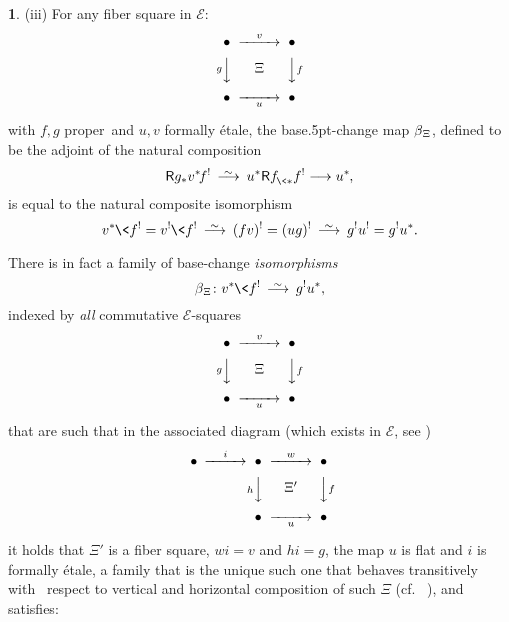 \documentclass{compositio}
\theoremstyle{plain}
\theoremstyle{definition}
\newtheorem{cosa}[thm]{}
\theoremstyle{remark}
\numberwithin{equation}{thm}
\begin{document}
\begin{cosa}
{\rm(iii)} For any fiber square in\/ ${\mathscr{E}}\!:${\vspace{2pt}}
$$
\CD
\bullet @>v>> \bullet  \\
@V g VV @VV f V \\
\bullet@>{\vbox to 0pt{\vss\hbox{$\Xi$}\vskip.21in}} > {\vbox to 0pt{\vskip-1.2 ex\hbox{$\scriptstyle u$}\vss}} >\bullet
\endCD
$$
with $f,g$ proper\ and $ u,v$ formally \'etale, the base{\kern.5pt}-change map $\beta_{{\mkern1mu}\Xi}$,  defined to be the
adjoint of the natural composition
\begin{equation}
\label{bcadj}
{\mathsf R} g_*v^*\!f^!{{\mkern8mu\longrightarrow \mkern-25.5mu{}^\sim\mkern17mu}} u^*{{\mathsf R} f^{}_{{\mkern-1mu}\<*}} f^! \longrightarrow u^*{\mkern-1mu},
\end{equation}
is equal to the natural composite isomorphism
\begin{equation}\label{beta}
v^*{\mkern-1mu}\<f^!= v^!{\mkern-1mu}\<f^!
{{\mkern8mu\longrightarrow \mkern-25.5mu{}^\sim\mkern17mu}} (fv)^!=(ug)^!{{\mkern8mu\longrightarrow \mkern-25.5mu{}^\sim\mkern17mu}}
g^!u^!  =g^!u^*.
\end{equation}

\goodbreak

There is in fact a family of base-change \emph{isomorphisms} 
\begin{equation}\label{bch}
\beta_{{\mkern1mu}\Xi}\colon v^*{\mkern-1mu}\<f^!{{\mkern8mu\longrightarrow \mkern-25.5mu{}^\sim\mkern17mu}} g^!u^*,
\end{equation}
indexed by \emph{all} commutative ${\mathscr{E}}$-squares 
$$
\CD
\bullet @>v>> \bullet  \\
@V g VV @VV f V \\
\bullet@>{\vbox to 0pt{\vss\hbox{$\Xi$}\vskip.21in}} > {\vbox to 0pt{\vskip-1.2 ex\hbox{$\scriptstyle u$}\vss}} >\bullet
\endCD
$$
 that are such that in the associated diagram (which exists in ${\mathscr{E}}$, see  \cite[\S2.2]{Nk})
\[
\CD
\bullet @>i>>\bullet @>w>> \bullet  \\
@.@V h VV @VV f V \\
@. \bullet@>{\vbox to 0pt{\vss\hbox{$\Xi'$}\vskip.21in}} > {\vbox to 0pt{\vskip-1.2 ex\hbox{$\scriptstyle u$}\vss}} >\bullet
\endCD
\]
it holds that $\Xi'$ is a fiber square, $wi=v$ and $hi=g$, the map $u$ is flat and $i$ is formally \'etale, a family that is the unique such one that behaves transitively with~ respect to vertical and horizontal composition of such $\Xi$ (cf.~ \cite[(4.8.2)(3)]{li}), and 
satisfies:{\vspace{3pt}}


\end{cosa}
\end{document}
